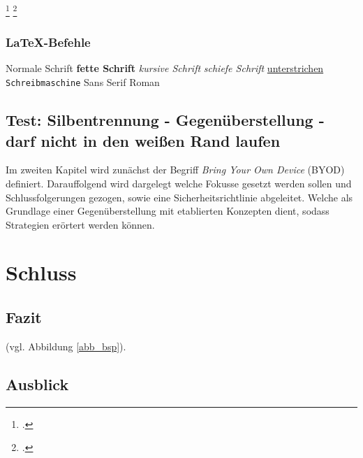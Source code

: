 \Blindtext\footcite[][34]{Digitaloekonomie}
\blinditemize
\blindtext\footcite[][511]{Tanenbaum2016}

\subsubsection{LaTeX-Befehle}
    \textnormal{Normale Schrift} 
    \textbullet\addspace \textbf{fette Schrift} 
    \textbullet\addspace \textit{kursive Schrift} 
    \textbullet\addspace \textsl{schiefe Schrift} 
    \textbullet\addspace \underline{unterstrichen} 
    \textbullet\addspace \texttt{Schreib\-ma\-schi\-ne} 
    \textbullet\addspace \textsf{Sans Serif} 
    \textbullet\addspace \textrm{Roman} 

\subsection{Test: Silbentrennung - Gegenüberstellung - darf nicht in den weißen Rand laufen}
Im zweiten Kapitel wird zunächst der Begriff \textit{Bring Your Own Device} (BYOD) definiert. Darauffolgend wird dargelegt welche Fokusse gesetzt werden sollen und Schlussfolgerungen gezogen, sowie eine Sicherheitsrichtlinie abgeleitet. Welche als Grundlage einer Gegenüberstellung mit etablierten Konzepten dient, sodass Strategien erörtert werden können. 

\section{Schluss}
\subsection{Fazit}
\blindtext (vgl. Abbildung \ref{abb_bsp}).

\subsection{Ausblick}
\blindtext
